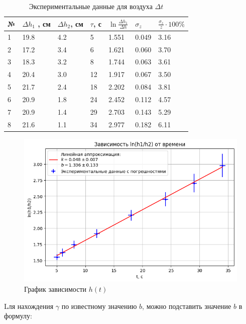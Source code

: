 \documentclass[a4paper,12pt]{article}
\begin{document}
\begin{table}[h!]
    \caption{Экспериментальные данные для воздуха $\Delta t$}
    \begin{center}
    \begin{tabular}{|l|l|l|l|l|l|l|}
        \hline
        № & $\Delta h_1$ , см & $\Delta h_2$, см & $\tau$, с & $\ln{\frac{\Delta h_1}{\Delta h}}$ & $\sigma_z$ & $\frac{\sigma_z}{z} \cdot 100\%$ \\\hline
        1 & 19.8 & 4.2 & 5  & 1.551 & 0.049 & 3.16 \\\hline
        2 & 17.2 & 3.4 & 6  & 1.621 & 0.060 & 3.70 \\\hline
        3 & 18.3 & 3.2 & 8  & 1.744 & 0.063 & 3.61 \\\hline
        4 & 20.4 & 3.0 & 12 & 1.917 & 0.067 & 3.50 \\\hline
        5 & 21.7 & 2.4 & 18 & 2.202 & 0.084 & 3.81 \\\hline 
        6 & 20.9 & 1.8 & 24 & 2.452 & 0.112 & 4.57 \\\hline
        7 & 20.9 & 1.4 & 29 & 2.703 & 0.143 & 5.29 \\\hline
        8 & 21.6 & 1.1 & 34 & 2.977 & 0.182 & 6.11 \\\hline
    \end{tabular}
    \end{center}
\end{table}

\begin{figure}[h!] 
    \centering
    \includegraphics[width=0.9\linewidth]{1.png} 
    \caption{График зависимости $h(t)$}
    \label{plan2} 
\end{figure}

Lля нахождения \(\gamma\) по известному значению \(b\), можно подставить значение \(b\) в формулу:
\end{document}
